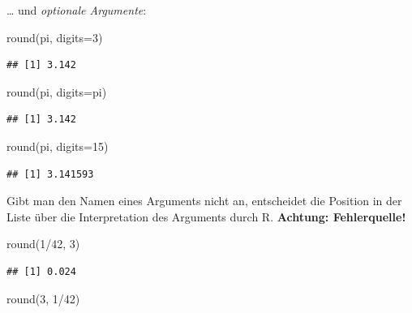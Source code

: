 \documentclass[
]{book}
\newenvironment{Shaded}{\begin{snugshade}}{\end{snugshade}}
\newcommand{\AttributeTok}[1]{\textcolor[rgb]{0.77,0.63,0.00}{#1}}
\newcommand{\DecValTok}[1]{\textcolor[rgb]{0.00,0.00,0.81}{#1}}
\newcommand{\FunctionTok}[1]{\textcolor[rgb]{0.00,0.00,0.00}{#1}}
\newcommand{\NormalTok}[1]{#1}
\newcommand{\SpecialCharTok}[1]{\textcolor[rgb]{0.00,0.00,0.00}{#1}}
\begin{document}
\ldots{} und \emph{optionale Argumente}:

\begin{Shaded}
\begin{Highlighting}[]
\FunctionTok{round}\NormalTok{(pi, }\AttributeTok{digits=}\DecValTok{3}\NormalTok{)}
\end{Highlighting}
\end{Shaded}

\begin{verbatim}
## [1] 3.142
\end{verbatim}

\begin{Shaded}
\begin{Highlighting}[]
\FunctionTok{round}\NormalTok{(pi, }\AttributeTok{digits=}\NormalTok{pi)}
\end{Highlighting}
\end{Shaded}

\begin{verbatim}
## [1] 3.142
\end{verbatim}

\begin{Shaded}
\begin{Highlighting}[]
\FunctionTok{round}\NormalTok{(pi, }\AttributeTok{digits=}\DecValTok{15}\NormalTok{)}
\end{Highlighting}
\end{Shaded}

\begin{verbatim}
## [1] 3.141593
\end{verbatim}

Gibt man den Namen eines Arguments nicht an, entscheidet die Position in der Liste über die Interpretation des Arguments durch R. \textbf{Achtung: Fehlerquelle!}

\begin{Shaded}
\begin{Highlighting}[]
\FunctionTok{round}\NormalTok{(}\DecValTok{1}\SpecialCharTok{/}\DecValTok{42}\NormalTok{, }\DecValTok{3}\NormalTok{)}
\end{Highlighting}
\end{Shaded}

\begin{verbatim}
## [1] 0.024
\end{verbatim}

\begin{Shaded}
\begin{Highlighting}[]
\FunctionTok{round}\NormalTok{(}\DecValTok{3}\NormalTok{, }\DecValTok{1}\SpecialCharTok{/}\DecValTok{42}\NormalTok{)}
\end{Highlighting}
\end{Shaded}
\end{document}
